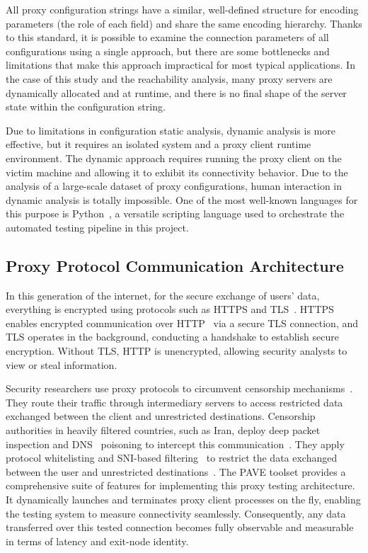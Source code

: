 \documentclass[10pt,conference]{IEEEtran}
\begin{document}
All proxy configuration strings have a similar, well-defined structure for encoding parameters (the role of each field) and share the same encoding hierarchy.
Thanks to this standard, it is possible to examine the connection parameters of all configurations using a single approach, but there are some bottlenecks and limitations that make this approach impractical for most typical applications.
In the case of this study and the reachability analysis, many proxy servers are dynamically allocated and at runtime, and there is no final shape of the server state within the configuration string.

Due to limitations in configuration static analysis, dynamic analysis is more effective, but it requires an isolated system and a proxy client runtime environment.
The dynamic approach requires running the proxy client on the victim machine and allowing it to exhibit its connectivity behavior.
Due to the analysis of a large-scale dataset of proxy configurations, human interaction in dynamic analysis is totally impossible.
One of the most well-known languages for this purpose is Python~\cite{python_org}, a versatile scripting language used to orchestrate the automated testing pipeline in this project.

\subsection{Proxy Protocol Communication Architecture}
In this generation of the internet, for the secure exchange of users' data, everything is encrypted using protocols such as HTTPS and TLS~\cite{rfc8446}.
HTTPS enables encrypted communication over HTTP~\cite{rfc9110} via a secure TLS connection, and TLS operates in the background, conducting a handshake to establish secure encryption.
Without TLS, HTTP is unencrypted, allowing security analysts to view or steal information.

Security researchers use proxy protocols to circumvent censorship mechanisms~\cite{tor2004}.
They route their traffic through intermediary servers to access restricted data exchanged between the client and unrestricted destinations.
Censorship authorities in heavily filtered countries, such as Iran, deploy deep packet inspection and DNS~\cite{rfc1034} poisoning to intercept this communication~\cite{aryan2013iran}.
They apply protocol whitelisting and SNI-based filtering~\cite{rfc6066} to restrict the data exchanged between the user and unrestricted destinations~\cite{irblock2025,aryapour2025}.
The PAVE toolset provides a comprehensive suite of features for implementing this proxy testing architecture.
It dynamically launches and terminates proxy client processes on the fly, enabling the testing system to measure connectivity seamlessly.
Consequently, any data transferred over this tested connection becomes fully observable and measurable in terms of latency and exit-node identity.
\end{document}
